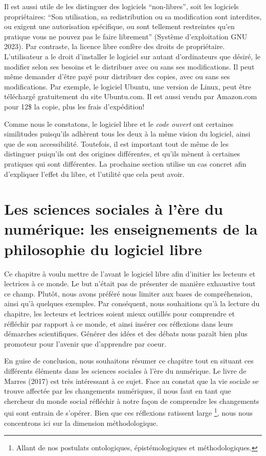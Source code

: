 \documentclass[
  letterpaper,
]{scrbook}
\begin{document}
Il est aussi utile de les distinguer des logiciels ``non-libres'', soit
les logiciels propriétaires: ``Son utilisation, sa redistribution ou sa
modification sont interdites, ou exigent une autorisation spécifique, ou
sont tellement restreintes qu'en pratique vous ne pouvez pas le faire
librement'' (Système d'exploitation GNU 2023). Par contraste, la licence
libre confère des droits de propriétaire. L'utilisateur a le droit
d'installer le logiciel sur autant d'ordinateurs que désiré, le modifier
selon ses besoins et le distribuer avec ou sans ses modifications. Il
peut même demander d'être payé pour distribuer des copies, avec ou sans
ses modifications. Par exemple, le logiciel Ubuntu, une version de
Linux, peut être téléchargé gratuitement du site Ubuntu.com. Il est
aussi vendu par Amazon.com pour 12\$ la copie, plus les frais
d'expédition!

Comme nous le constatons, le logiciel libre et le \emph{code ouvert} ont
certaines similitudes puisqu'ils adhèrent tous les deux à la même vision
du logiciel, ainsi que de son accessibilité. Toutefois, il est important
tout de même de les distinguer puiqu'ils ont des origines différentes,
et qu'ils mènent à certaines pratiques qui sont différentes. La
prochaine section utilise un cas concret afin d'expliquer l'effet du
libre, et l'utilité que cela peut avoir.

\hypertarget{les-sciences-sociales-uxe0-luxe8re-du-numuxe9rique-les-enseignements-de-la-philosophie-du-logiciel-libre}{%
\section{Les sciences sociales à l'ère du numérique: les enseignements
de la philosophie du logiciel
libre}\label{les-sciences-sociales-uxe0-luxe8re-du-numuxe9rique-les-enseignements-de-la-philosophie-du-logiciel-libre}}

Ce chapitre à voulu mettre de l'avant le logiciel libre afin d'initier
les lecteurs et lectrices à ce monde. Le but n'était pas de présenter de
manière exhaustive tout ce champ. Plutôt, nous avons préféré nous
limiter aux bases de compréhension, ainsi qu'à quelques exemples. Par
conséquent, nous souhaitions qu'à la lecture du chapitre, les lecteurs
et lectrices soient mieux outillés pour comprendre et réfléchir par
rapport à ce monde, et ainsi insérer ces réflexions dans leurs démarches
scientifiques. Générer des idées et des débats nous paraît bien plus
promoteur pour l'avenir que d'apprendre par coeur.

En guise de conclusion, nous souhaitons résumer ce chapitre tout en
situant ces différents éléments dans les sciences sociales à l'ère du
numérique. Le livre de Marres (2017) est très intéressant à ce sujet.
Face au constat que la vie sociale se trouve affectée par les
changements numériques, il nous faut en tant que chercheur du monde
social réfléchir à notre façon de comprendre les changements qui sont
entrain de s'opérer. Bien que ces réflexions ratissent large
\footnote{Allant de nos postulats ontologiques, épistémologiques et
  méthodologiques.}, nous nous concentrons ici sur la dimension
méthodologique.
\end{document}
